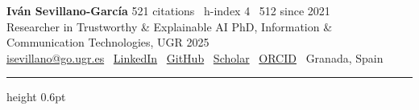 \documentclass[10pt,a4paper]{article}
\begin{document}
{\Large \textbf{\textcolor{titleblue}{Iván Sevillano-García}}} \hfill {\footnotesize \textcolor{subtle}{521 citations \textbar\ h-index 4 \textbar\ 512 since 2021}} \\[0.1em]
{\footnotesize Researcher in Trustworthy \& Explainable AI \quad\textbar\quad PhD, Information \& Communication Technologies, UGR 2025} \\[0.1em]
{\footnotesize
\href{mailto:isevillano@go.ugr.es}{isevillano@go.ugr.es} \textbar\
\href{https://www.linkedin.com/in/iván-sevillano-garcía-304801116}{LinkedIn} \textbar\
\href{https://github.com/isega24}{GitHub} \textbar\
\href{https://scholar.google.com/citations?user=g5xyauEAAAAJ}{Scholar} \textbar\
\href{https://orcid.org/0000-0002-5029-9106}{ORCID} \textbar\
Granada, Spain
}

\vspace{0.3em}
\hrule height 0.6pt
\vspace{0.2em}
\end{document}
